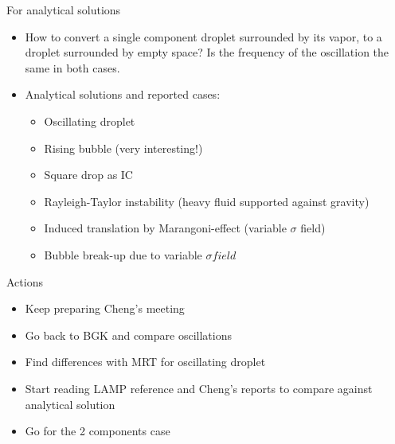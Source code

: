 \documentclass{beamer}
\begin{document}
	\begin{frame}{For analytical solutions}
		\begin{itemize}
			\item How to convert a single component droplet surrounded by its vapor, to a droplet surrounded by empty space? Is the frequency of the oscillation the same in both cases.
			
			\item Analytical solutions and reported cases:
			\begin{itemize}
				\item Oscillating droplet
				\item Rising bubble (very interesting!)
				\item Square drop as IC
				\item Rayleigh-Taylor instability (heavy fluid supported against gravity)
				\item Induced translation by Marangoni-effect (variable $\sigma$ field)
				\item Bubble break-up due to variable $\sigma field$
			\end{itemize}
		\end{itemize}
	\end{frame}

	\begin{frame}{Actions}
		\begin{itemize}
			\item Keep preparing Cheng's meeting
			\item Go back to BGK and compare oscillations
			\item Find differences with MRT for oscillating droplet
			\item Start reading LAMP reference and Cheng's reports to compare against analytical solution
			\item Go for the 2 components case
		\end{itemize}
	\end{frame}
	
	
	
	
\end{document}
